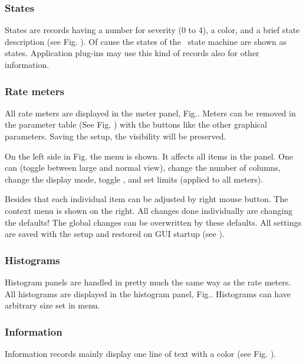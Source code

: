 {\subsubsection{States}
States are records having a number for severity (0 to 4), a color,
and a brief state description (see Fig. ).
Of cause the states of the \dabc\ state machine are shown as states.
Application plug-ins may use this kind of records also for other
information.

\subsubsection{Rate meters}
All rate meters are displayed in the meter panel, Fig.. 
Meters can be removed
in the parameter table (See Fig. ) 
with the  buttons like the other graphical parameters.
Saving the setup, the visibility will be preserved.

On the left side in Fig.  the 
menu is shown. It affects all items in the panel. One can 
(toggle between large and normal view), change the number of
columns, change the display mode, toggle , and set limits
(applied to all meters). 

Besides that each individual item can be
adjusted by right mouse button. The context menu is shown on the right.
All changes done individually are changing the defaults!
The global changes can be overwritten by these defaults.
All settings are saved with the setup and restored on GUI startup
(see ).

\subsubsection{Histograms}
Histogram panels are handled in pretty much the same way as the rate meters.
All histograms are displayed in the histogram panel, Fig.. 
Histograms can have arbitrary size set in  menu.

\subsubsection{Information}
Information records mainly display one line of text with a color
(see Fig. ).

}
